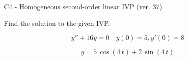 \begin{exercise}
  \begin{exerciseTitle}C4 - Homogeneous second-order linear IVP (ver. 37)\end{exerciseTitle}
  \begin{exerciseStatement}
    
Find the solution to the given IVP.

    
\[y''+16y = 0 \hspace{1em} y(0) = 5 , y'(0) = 8\]

  \end{exerciseStatement}
  \begin{exerciseAnswer}
    
\[y= 5 \, \cos\left(4 \, t\right) + 2 \, \sin\left(4 \, t\right)\]

  \end{exerciseAnswer}
\end{exercise}